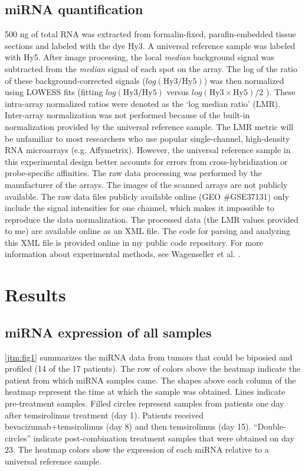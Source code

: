 \subsection{miRNA quantification}
500 ng of total RNA was extracted from formalin-fixed, parafin-embedded
tissue sections and labeled with the dye Hy3. A universal reference sample was labeled with
Hy5. After image processing, the local \textit{median} background 
signal was subtracted from the \textit{median} signal 
of each spot on the array. The log of the ratio of these background-corrected signals
($log(\text{Hy3}/\text{Hy5})$) was then
normalized using LOWESS fits (fitting $log(\text{Hy3}/\text{Hy5})$ versus  
$log(\text{Hy3} \times \text{Hy5}) / 2$ ).
These intra-array normalized ratios were denoted as the `log median ratio' (LMR).
Inter-array normalization was not performed because of the built-in normalization provided
by the universal reference sample.
The LMR metric will be unfamiliar to most researchers who use 
popular single-channel, high-density RNA microarrays (e.g. Affymetrix).
However, the universal reference sample in this experimental
design better accounts for errors from cross-hybridization or
probe-specific affinities. The raw data processing was performed by the manufacturer of the
arrays. The images of the scanned arrays are not publicly available.
The raw data files publicly available online (GEO \#GSE37131) only include
the signal intensities for one channel, which makes it impossible to reproduce
the data normalization. The processed data (the LMR values provided to me) are available
online as an XML file. The code for parsing and analyzing this XML file is provided online
in my public code repository. For more information about experimental methods, see
Wagenseller et al. \cite{Wagenseller:2013fj}.



\section{Results}

\subsection{miRNA expression of all samples}

\autoref{jtm:fig1} summarizes the miRNA data from tumors that could be biposied and profiled
(14 of the 17 patients). The row of colors above the heatmap indicate the patient
from which miRNA samples came. The shapes above each column of the heatmap represent the time
at which the sample was obtained. Lines indicate pre-treatment samples. Filled circles represent
samples from patients one day after temsirolimus treatment (day 1). Patients received
bevacizumab+temsirolimus (day 8) and then temsirolimus (day 15). ``Double-circles'' indicate
post-combination treatment samples
that were obtained on day 23. The heatmap colors show the expression of each miRNA relative to
a universal reference sample.

